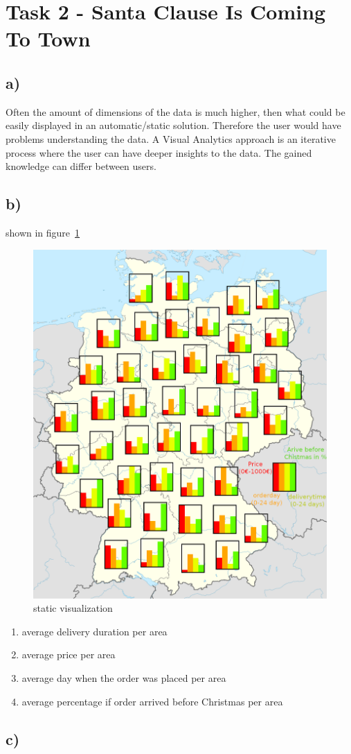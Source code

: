 \documentclass[a4paper]{article}
\begin{document}
\section*{Task 2 - Santa Clause Is Coming To Town}

\subsection*{a)} Often the amount of dimensions of the data is much higher, then what could be easily displayed in an automatic/static solution. Therefore the user would have problems understanding the data. A Visual Analytics approach is an iterative process where the user can have deeper insights to the data. The gained knowledge can differ between users.
\subsection*{b)}
shown in figure~\ref{fig:germany-2b}
\begin{figure}[!ht]
	\centering
	\includegraphics[width=0.7\linewidth]{germany-2b}
	\caption{static visualization}
	\label{fig:germany-2b}
\end{figure}

\begin{enumerate}
	\item average delivery duration per area
	\item average price per area
	\item average day when the order was placed per area
	\item average percentage if order arrived before Christmas per area
\end{enumerate}
\subsection*{c)}
\end{document}
